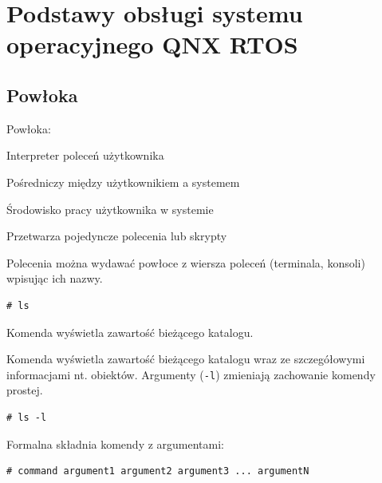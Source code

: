 \section{Podstawy obsługi systemu operacyjnego QNX RTOS}

\subsection{Powłoka}

Powłoka: 

\begin{myitemize}
\item Interpreter poleceń użytkownika
\item Pośredniczy między użytkownikiem a systemem
\item Środowisko pracy użytkownika w systemie
\item Przetwarza pojedyncze polecenia lub skrypty
\end{myitemize}


\begin{example} \label{ex:prostakomenda} 

Polecenia można wydawać powłoce z wiersza poleceń (terminala, konsoli) wpisując ich nazwy.

\begin{lstlisting}[style=MyBashStyle]
# ls
\end{lstlisting}

Komenda wyświetla zawartość bieżącego katalogu.  
\end{example}

\begin{example}\label{ex:prostakomenda2} 

Komenda wyświetla zawartość bieżącego katalogu wraz ze szczegółowymi informacjami nt. obiektów. Argumenty (\lstinline[style=MyBashStyle]{-l}) zmieniają zachowanie komendy prostej.

\begin{lstlisting}[style=MyBashStyle]
# ls -l 
\end{lstlisting}


Formalna składnia komendy z argumentami:

\begin{lstlisting}[style=MyBashStyle]
# command argument1 argument2 argument3 ... argumentN
\end{lstlisting}
\end{example}

